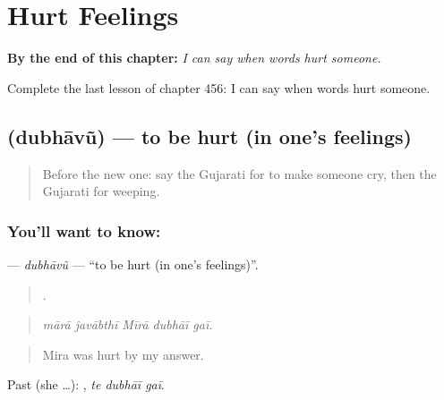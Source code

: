 
\chapter{Hurt Feelings}
\label{ch:gu-hurt-feelings}

\begin{chapteropening}
\textbf{By the end of this chapter:} \emph{I can say when words hurt someone.}

Complete the last lesson of chapter 456: I can say when words hurt someone.
\end{chapteropening}

\section[\texorpdfstring{\gu{દુભાવું} (dubhāvũ)}{દુભાવું (dubhāvũ)}]{ (dubhāvũ) — to be hurt (in one's feelings)}

\label{lesson:GU-C456-dubhavu}



\begin{quote}
Before the new one: say the Gujarati for to make someone cry, then the Gujarati for weeping.
\end{quote}

\subsection*{You'll want to know: }
\textbf{} — \emph{dubhāvũ} — \textquotedblleft{}to be hurt (in one's feelings)\textquotedblright{}.

\begin{quote}
    .
\end{quote}

\begin{quote}
\emph{mārā javābthī Mīrā dubhāī gaī.}
\end{quote}

\begin{quote}
Mira was hurt by my answer.
\end{quote}

Past (she …):   , \emph{te dubhāī gaī}.

